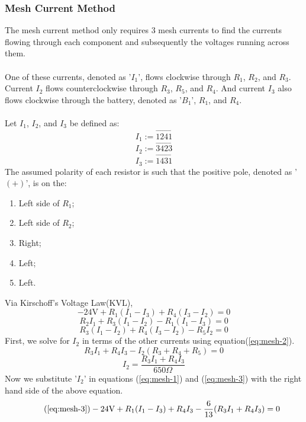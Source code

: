 \documentclass{article}
\begin{document}
	\subsubsection[Mesh]{Mesh Current Method}
	The mesh current method only requires 3 mesh currents to 
	find the 
	currents flowing through each component and subsequently the voltages 
	running across them. \\ \\
	One of these currents, denoted as '$I_1$', flows clockwise through $R_1$, 
	$R_2$, and $R_3$.  Current $I_2$ flows counterclockwise through $R_3$, 
	$R_5$, and 
	$R_4$.  And current $I_3$ also flows clockwise through the battery, denoted 
	as '$B_1$', $R_1$, and $R_4$. \\ \\
	Let $I_1$, $I_2$, and $I_3$ be defined as:
	$$ I_1:=\overrightarrow{1241}$$
	$$ I_2:=\overrightarrow{3423}$$
	$$ I_3:=\overrightarrow{1431}$$
	The assumed polarity of each resistor is such that the positive pole, 
	denoted as '$(+)$', is on the:
	\begin{enumerate}
		\item Left side of $R_1$;
		\item Left side of $R_2$;
		\item Right;
		\item Left;
		\item Left.
	\end{enumerate}
	Via Kirschoff's Voltage Law(KVL),
	\begin{equation}\label{eq:mesh-3}
		-24\text{V} + R_1(I_1-I_3) + R_4(I_3-I_2) = 0
	\end{equation}
	\begin{equation}\label{eq:mesh-1}
		R_2I_1 + R_3(I_1-I_2) - R_1(I_1-I_3) = 0
	\end{equation}
	\begin{equation}\label{eq:mesh-2}
		R_3(I_1-I_2) + R_4(I_3-I_2) - R_5I_2 = 0
	\end{equation}
	First, we solve for $I_2$ in terms of the other currents using 
	equation(\ref{eq:mesh-2}).
	$$ R_3I_1+R_4I_3-I_2(R_3 + R_4 + R_5) = 0$$
	\begin{equation}\label{eq:cur_2-in-cur_1-cur_3}
		I_2 = \frac{R_3I_1 + R_4I_3}{650\Omega}
	\end{equation}
	Now we substitute '$I_2$' in equations (\ref{eq:mesh-1}) and 
	(\ref{eq:mesh-3}) with the right hand side of the above equation.
	\begin{equation}\tag{\ref{eq:mesh-3}}
		-24\text{V} + R_1(I_1-I_3) + R_4I_3- \frac{6}{13}(R_3I_1 + R_4I_3) = 0
	\end{equation}
\end{document}
